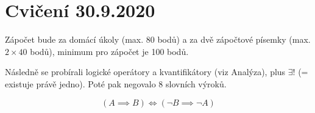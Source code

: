 \documentclass[12pt]{article}					%
\begin{document}
\section{Cvičení 30.9.2020}
    \begin{poznamka}[Zápočet]
        Zápočet bude za domácí úkoly (max. 80 bodů) a za dvě zápočtové písemky (max. $2 \times 40$ bodů), minimum pro zápočet je 100 bodů.
    \end{poznamka}
    Následně se probírali logické operátory a kvantifikátory (viz Analýza), plus $\exists!$ (= existuje právě jedno). Poté pak negovalo 8 slovních výroků.

    \begin{upozorneni}
            $$ (A \implies B) \Leftrightarrow (\neg B \implies \neg A) $$
    \end{upozorneni}
\end{document}
